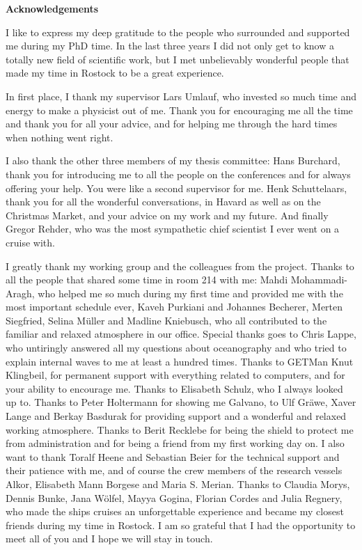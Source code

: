 \cleardoublepage

\thispagestyle{plain}

\begin{center}
 \textbf{Acknowledgements}
\end{center}

I like to express my deep gratitude to the people who surrounded and supported 
me during my PhD time. In the last three years I did not only get to know a 
totally new field of scientific work, but I met unbelievably wonderful 
people that made my time in Rostock to be a great experience. 

In first place, I thank my supervisor Lars Umlauf, who invested so much time 
and energy to make a physicist out of me. Thank you for encouraging me all the 
time and thank you for all your advice, and for helping me through the hard 
times when nothing went right.

I also thank the other three members of my thesis committee: Hans Burchard, 
thank you for introducing me to all the people on the conferences and for 
always offering your help. You were like a second supervisor for me. Henk 
Schuttelaars, thank you for all the wonderful conversations, in Havard as well 
as on the Christmas Market, and your advice on my work and my future. And 
finally Gregor Rehder, who was the most sympathetic chief scientist I ever went 
on a cruise with. 

I greatly thank my working group and the colleagues from the project. Thanks 
to all the people that shared some time in room 214 with me: Mahdi 
Mohammadi-Aragh, who helped me so much during my first time and provided me with 
the most important schedule ever, Kaveh Purkiani and Johannes Becherer, Merten 
Siegfried, Selina Müller and Madline Kniebusch, who all contributed to the 
familiar and relaxed atmosphere in our office. Special thanks goes to Chris 
Lappe, who untiringly answered all my questions about oceanography and who tried 
to explain internal waves to me at least a hundred times. Thanks to GETMan Knut 
Klingbeil, for permanent support with everything related to computers, and for 
your ability to encourage me. Thanks to Elisabeth Schulz, who I always looked up 
to. Thanks to Peter Holtermann for showing me Galvano, to Ulf Gräwe, 
Xaver Lange and Berkay Basdurak for providing support and a wonderful and 
relaxed working atmosphere. Thanks to Berit Recklebe for being the shield to 
protect me from administration and for being a friend from my first working day 
on. I also want to thank Toralf Heene and Sebastian Beier for the technical 
support and their patience with me, and of course the crew members of the 
research vessels Alkor, Elisabeth Mann Borgese and Maria S. Merian. Thanks to 
Claudia Morys, Dennis Bunke, Jana Wölfel, Mayya Gogina, Florian Cordes and Julia 
Regnery, who made the ships cruises an unforgettable experience and became my 
closest friends during my time in Rostock.\newpage
\thispagestyle{plain} I am so grateful that I had the opportunity to meet all of 
you and I hope we will stay in touch.

